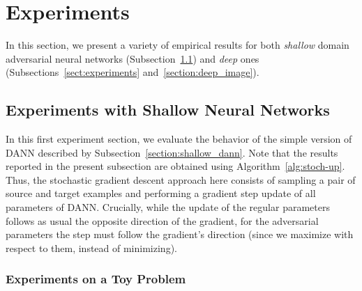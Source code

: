 \documentclass[twoside,11pt]{article}
\begin{document}
\section{Experiments}
In this section, we present a variety of empirical results for both \emph{shallow} domain adversarial neural networks (Subsection~\ref{section:experiments_shallow}) and \emph{deep} ones (Subsections~\ref{sect:experiments} and~\ref{section:deep_image}). 
 
\subsection{Experiments with Shallow Neural Networks}
\label{section:experiments_shallow}

In this first experiment section, we evaluate the behavior of the simple version of DANN described by Subsection~\ref{section:shallow_dann}. Note that the results reported in the present subsection are obtained using Algorithm~\ref{alg:stoch-up}.
Thus, the stochastic gradient descent approach here consists of sampling a pair of source and target examples and performing a gradient step update of all parameters of DANN. Crucially, while the update of the regular parameters follows as usual the opposite direction of the gradient, for the adversarial parameters the step must follow the gradient's direction (since we maximize with respect to them, instead of minimizing). 


\subsubsection{Experiments on a Toy Problem}
\label{sec:toy_problem}
\end{document}
